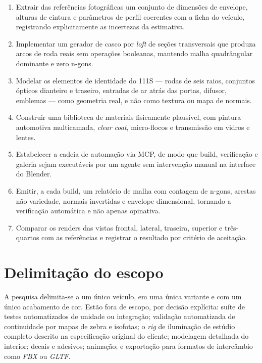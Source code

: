 \begin{enumerate}[label=\arabic*),leftmargin=1.4cm]
  \item Extrair das refer\^encias fotogr\'aficas um conjunto de dimens\~oes de envelope, alturas
        de cintura e par\^ametros de perfil coerentes com a ficha do ve\'iculo, registrando
        explicitamente as incertezas da estimativa.
  \item Implementar um gerador de casco por \emph{loft} de se\c{c}\~oes transversais que produza
        arcos de roda reais sem opera\c{c}\~oes booleanas, mantendo malha quadr\^angular
        dominante e zero n-gons.
  \item Modelar os elementos de identidade do 111S --- rodas de seis raios, conjuntos ópticos
        dianteiro e traseiro, entradas de ar atr\'as das portas, difusor, emblemas --- como
        geometria real, e n\~ao como textura ou mapa de normais.
  \item Construir uma biblioteca de materiais fisicamente plaus\'ivel, com pintura automotiva
        multicamada, \emph{clear coat}, micro-flocos e transmiss\~ao em vidros e lentes.
  \item Estabelecer a cadeia de automa\c{c}\~ao via MCP, de modo que build, verifica\c{c}\~ao e
        galeria sejam execut\'aveis por um agente sem interven\c{c}\~ao manual na interface do
        Blender.
  \item Emitir, a cada build, um relat\'orio de malha com contagem de n-gons, arestas
        n\~ao variedade, normais invertidas e envelope dimensional, tornando a verifica\c{c}\~ao
        autom\'atica e n\~ao apenas opinativa.
  \item Comparar os renders das vistas frontal, lateral, traseira, superior e tr\^es-quartos com
        as refer\^encias e registrar o resultado por crit\'erio de aceita\c{c}\~ao.
\end{enumerate}

\section{Delimita\c{c}\~ao do escopo}

A pesquisa delimita-se a um \'unico ve\'iculo, em uma \'unica variante e com um \'unico acabamento
de cor. Est\~ao fora de escopo, por decis\~ao expl\'icita: su\'ite de testes automatizados de
unidade ou integra\c{c}\~ao; valida\c{c}\~ao automatizada de continuidade por mapas de zebra e
isofotas; o \emph{rig} de ilumina\c{c}\~ao de est\'udio completo descrito na especifica\c{c}\~ao
original do cliente; modelagem detalhada do interior; decais e adesivos; anima\c{c}\~ao; e
exporta\c{c}\~ao para formatos de interc\^ambio como \emph{FBX} ou \emph{GLTF}.

